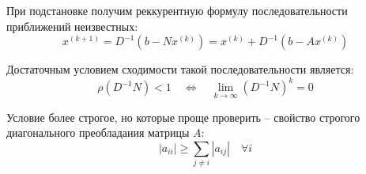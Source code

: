 \documentclass[lab1-report.tex]{subfiles}
\begin{document}
    При подстановке получим реккурентную формулу последовательности приближений неизвестных:
    \[x^{(k+1)} = D^{-1}(b - N x^{(k)}) = x^{(k)} + D^{-1}(b - A x^{(k)})\]

    Достаточным условием сходимости такой последовательности является:
    \[\rho(D^{-1}N) < 1 \quad \Leftrightarrow \quad \lim_{k \rightarrow \infty} (D^{-1}N)^k = 0\]

    Условие более строгое, но которые проще проверить -- свойство строгого диагонального преобладания матрицы $A$:
    \[|a_{ii}| \geq \sum _{j\neq i}|a_{ij}| \quad \forall i\]
\end{document}
